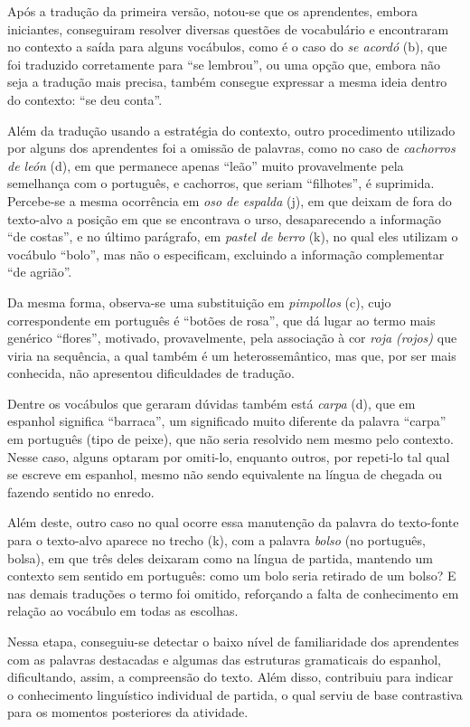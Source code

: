 \documentclass[portuguese]{textolivre}
\begin{document}
Após a tradução da primeira versão, notou-se que os aprendentes, embora iniciantes, conseguiram resolver diversas questões de vocabulário e encontraram no contexto a saída para alguns vocábulos, como é o caso do \textit{se acordó} 
 (b), que foi traduzido corretamente para “se lembrou”, ou uma opção que, embora não seja a tradução mais precisa, também consegue expressar a mesma ideia dentro do contexto: “se deu conta”.

Além da tradução usando a estratégia do contexto, outro procedimento utilizado por alguns dos aprendentes foi a omissão de palavras, como no caso de \textit{cachorros de león} (d), em que permanece apenas “leão” muito provavelmente pela semelhança com o português, e cachorros, que seriam “filhotes”, é suprimida. Percebe-se a mesma ocorrência em \textit{oso de espalda} (j), em que deixam de fora do texto-alvo a posição em que se encontrava o urso, desaparecendo a informação “de costas”, e no último parágrafo, em \textit{pastel de berro} (k), no qual eles utilizam o vocábulo “bolo”, mas não o especificam, excluindo a informação complementar “de agrião”.

Da mesma forma, observa-se uma substituição em \textit{pimpollos} (c), cujo correspondente em português é “botões de rosa”, que dá lugar ao termo mais genérico “flores”, motivado, provavelmente, pela associação à cor \textit{roja (rojos)} que viria na sequência, a qual também é um heterossemântico, mas que, por ser mais conhecida, não apresentou dificuldades de tradução.

Dentre os vocábulos que geraram dúvidas também está \textit{carpa} (d), que em espanhol significa “barraca”, um significado muito diferente da palavra “carpa” em português (tipo de peixe), que não seria resolvido nem mesmo pelo contexto. Nesse caso, alguns optaram por omiti-lo, enquanto outros, por repeti-lo tal qual se escreve em espanhol, mesmo não sendo equivalente na língua de chegada ou fazendo sentido no enredo.

Além deste, outro caso no qual ocorre essa manutenção da palavra do texto-fonte para o texto-alvo aparece no trecho (k), com a palavra \textit{bolso} (no português, bolsa), em que três deles deixaram como na língua de partida, mantendo um contexto sem sentido em português: como um bolo seria retirado de um bolso? E nas demais traduções o termo foi omitido, reforçando a falta de conhecimento em relação ao vocábulo em todas as escolhas.

Nessa etapa, conseguiu-se detectar o baixo nível de familiaridade dos aprendentes com as palavras destacadas e algumas das estruturas gramaticais do espanhol, dificultando, assim, a compreensão do texto. Além disso, contribuiu para indicar o conhecimento linguístico individual de partida, o qual serviu de base contrastiva para os momentos posteriores da atividade.
\end{document}
